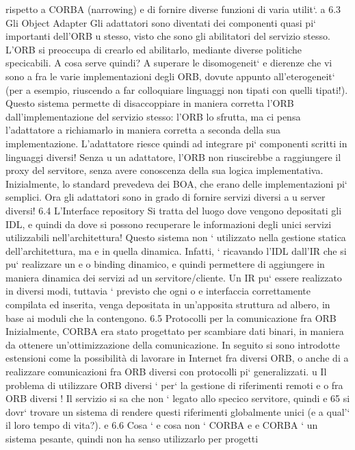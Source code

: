 \documentclass[a4paper,12pt]{article}
\begin{document}
rispetto a CORBA (narrowing) e di fornire diverse funzioni di varia utilit`.
a
6.3
Gli Object Adapter
Gli adattatori sono diventati dei componenti quasi pi` importanti dell'ORB
u
stesso, visto che sono gli abilitatori del servizio stesso. L'ORB si preoccupa di
crearlo ed abilitarlo, mediante diverse politiche specicabili.
A cosa serve quindi? A superare le disomogeneit` e dierenze che vi sono
a
fra le varie implementazioni degli ORB, dovute appunto all'eterogeneit` (per
a
esempio, riuscendo a far colloquiare linguaggi non tipati con quelli tipati!).
Questo sistema permette di disaccoppiare in maniera corretta l'ORB dall'implementazione del servizio stesso: l'ORB lo
sfrutta, ma ci pensa l'adattatore a
richiamarlo in maniera corretta a seconda della sua implementazione. L'adattatore riesce quindi ad integrare pi`
componenti scritti in linguaggi diversi! Senza
u
un adattatore, l'ORB non riuscirebbe a raggiungere il proxy del servitore, senza
avere conoscenza della sua logica implementativa.
Inizialmente, lo standard prevedeva dei BOA, che erano delle implementazioni pi` semplici. Ora gli adattatori sono in
grado di fornire servizi diversi a
u
server diversi!
6.4
L'Interface repository
Si tratta del luogo dove vengono depositati gli IDL, e quindi da dove si possono
recuperare le informazioni degli unici servizi utilizzabili nell'architettura!
Questo sistema non ` utilizzato nella gestione statica dell'architettura, ma
e
in quella dinamica. Infatti, ` ricavando l'IDL dall'IR che si pu` realizzare un
e
o
binding dinamico, e quindi permettere di aggiungere in maniera dinamica dei
servizi ad un servitore/cliente.
Un IR pu` essere realizzato in diversi modi, tuttavia ` previsto che ogni
o
e
interfaccia correttamente compilata ed inserita, venga depositata in un'apposita
struttura ad albero, in base ai moduli che la contengono.
6.5
Protocolli per la comunicazione fra ORB
Inizialmente, CORBA era stato progettato per scambiare dati binari, in maniera
da ottenere un'ottimizzazione della comunicazione. In seguito si sono introdotte
estensioni come la possibilità di lavorare in Internet fra diversi ORB, o anche di
a
realizzare comunicazioni fra ORB diversi con protocolli pi` generalizzati.
u
Il problema di utilizzare ORB diversi ` per` la gestione di riferimenti remoti
e
o
fra ORB diversi ! Il servizio si sa che non ` legato allo specico servitore, quindi
e
65
si dovr` trovare un sistema di rendere questi riferimenti globalmente unici (e
a
qual'` il loro tempo di vita?).
e
6.6
Cosa ` e cosa non ` CORBA
e
e
CORBA ` un sistema pesante, quindi non ha senso utilizzarlo per progetti
\end{document}

